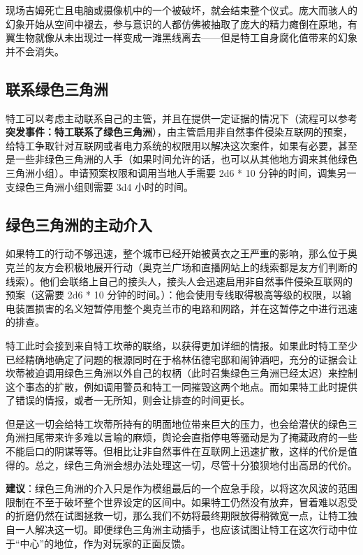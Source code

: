 现场吉姆死亡且电脑或摄像机中的一个被破坏，就会结束整个仪式。庞大而骇人的幻象开始从空间中褪去，参与意识的人都仿佛被抽取了庞大的精力瘫倒在原地，有翼生物就像从未出现过一样变成一滩黑线离去——但是特工自身腐化值带来的幻象并不会消失。

\subsection{联系绿色三角洲}

特工可以考虑主动联系自己的主管，并且在提供一定证据的情况下（流程可以参考\textbf{突发事件：特工联系了绿色三角洲}），由主管启用非自然事件侵染互联网的预案，给特工争取针对互联网或者电力系统的权限用以解决这次案件，如果有必要，甚至是一些非绿色三角洲的人手（如果时间允许的话，也可以从其他地方调来其他绿色三角洲小组）。申请预案权限和调用当地人手需要 2d6 * 10 分钟的时间，调集另一支绿色三角洲小组则需要 3d4 小时的时间。

\subsection{绿色三角洲的主动介入}

如果特工的行动不够迅速，整个城市已经开始被黄衣之王严重的影响，那么位于奥克兰的友方会积极地展开行动（奥克兰广场和直播网站上的线索都是友方们判断的线索）。他们会联络上自己的接头人，接头人会迅速启用非自然事件侵染互联网的预案（这需要 2d6 * 10 分钟的时间。）：他会使用专线取得极高等级的权限，以输电装置损害的名义短暂停用整个奥克兰市的电路和网路，并在这暂停之中进行迅速的排查。

特工此时会接到来自特工坎蒂的联络，以获得更加详细的情报。如果此时特工至少已经精确地确定了问题的根源同时在于格林伍德宅邸和闹钟酒吧，充分的证据会让坎蒂被迫调用绿色三角洲以外自己的权柄（此时召集绿色三角洲已经太迟）来控制这个事态的扩散，例如调用警员和特工一同摧毁这两个地点。而如果特工此时提供了错误的情报，或者一无所知，则会让排查的时间更长。

但是这一切会给特工坎蒂所持有的明面地位带来巨大的压力，也会给潜伏的绿色三角洲扫尾带来许多难以言喻的麻烦，舆论会直指停电等骚动是为了掩藏政府的一些不能启口的阴谋等等。但相比让非自然事件在互联网上迅速扩散，这样的代价是值得的。总之，绿色三角洲会想办法处理这一切，尽管十分狼狈地付出高昂的代价。

\textbf{建议}：绿色三角洲的介入只是作为模组最后的一个应急手段，以将这次风波的范围限制在不至于破坏整个世界设定的区间中。如果特工仍然没有放弃，冒着难以忍受的折磨仍然在试图拯救一切，那么我们不妨将最终期限放得稍微宽一点，让特工独自一人解决这一切。即便绿色三角洲主动插手，也应该试图让特工在这次行动中位于“中心”的地位，作为对玩家的正面反馈。


